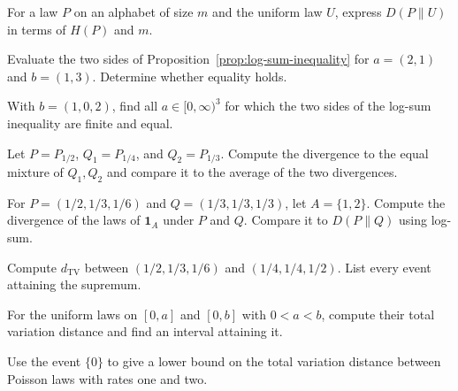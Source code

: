 \documentclass[11pt,oneside]{book}
\theoremstyle{definition}
\theoremstyle{remark}
\begin{document}
\begin{practiceexercise}
\label{pex:relative-entropy-uniform-forecast}
For a law $P$ on an alphabet of size $m$ and the uniform law $U$,
express $D(P\|U)$ in terms of $H(P)$ and $m$.
\end{practiceexercise}

\begin{practiceexercise}
\label{pex:log-sum-two-terms}
Evaluate the two sides of Proposition~\ref{prop:log-sum-inequality}
for $a=(2,1)$ and $b=(1,3)$. Determine whether equality holds.
\end{practiceexercise}

\begin{practiceexercise}
\label{pex:log-sum-zero-masses}
With $b=(1,0,2)$, find all $a\in[0,\infty)^3$ for which the two
sides of the log-sum inequality are finite and equal.
\end{practiceexercise}

\begin{practiceexercise}
\label{pex:relative-entropy-forecast-mixture}
Let $P=P_{1/2}$, $Q_1=P_{1/4}$, and $Q_2=P_{1/3}$. Compute the
divergence to the equal mixture of $Q_1,Q_2$ and compare it to
the average of the two divergences.
\end{practiceexercise}

\begin{practiceexercise}
\label{pex:relative-entropy-binary-event}
For $P=(1/2,1/3,1/6)$ and $Q=(1/3,1/3,1/3)$, let
$A=\{1,2\}$. Compute the divergence of the laws of $\mathbf 1_A$
under $P$ and $Q$. Compare it to $D(P\|Q)$ using log-sum.
\end{practiceexercise}

\begin{practiceexercise}
\label{pex:tv-three-outcomes}
Compute $d_{\mathrm{TV}}$ between $(1/2,1/3,1/6)$ and
$(1/4,1/4,1/2)$. List every event attaining the supremum.
\end{practiceexercise}

\begin{practiceexercise}
\label{pex:tv-nested-intervals}
For the uniform laws on $[0,a]$ and $[0,b]$ with $0<a<b$,
compute their total variation distance and find an interval
attaining it.
\end{practiceexercise}

\begin{practiceexercise}
\label{pex:tv-poisson-zero}
Use the event $\{0\}$ to give a lower bound on the total
variation distance between Poisson laws with rates one and two.
\end{practiceexercise}
\end{document}
